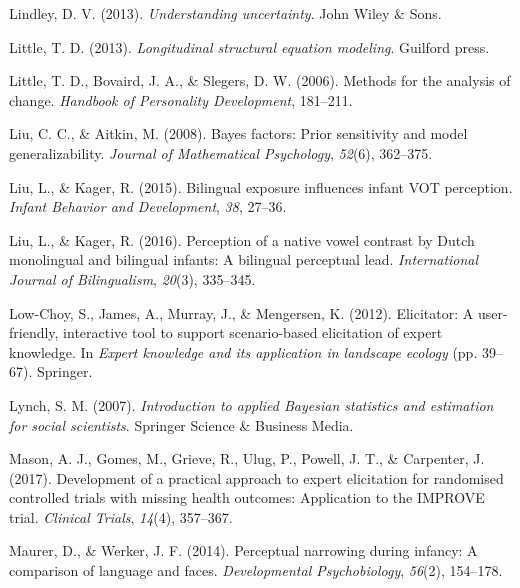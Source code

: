 \documentclass[openright,titlepage,12pt,a4paper]{book}
\begin{document}
\leavevmode\hypertarget{ref-lindley_understanding_2013}{}%
Lindley, D. V. (2013). \emph{Understanding uncertainty}. John Wiley \& Sons.

\leavevmode\hypertarget{ref-little_longitudinal_2013}{}%
Little, T. D. (2013). \emph{Longitudinal structural equation modeling}. Guilford press.

\leavevmode\hypertarget{ref-little_methods_2006}{}%
Little, T. D., Bovaird, J. A., \& Slegers, D. W. (2006). Methods for the analysis of change. \emph{Handbook of Personality Development}, 181--211.

\leavevmode\hypertarget{ref-liu_bayes_2008}{}%
Liu, C. C., \& Aitkin, M. (2008). Bayes factors: Prior sensitivity and model generalizability. \emph{Journal of Mathematical Psychology}, \emph{52}(6), 362--375.

\leavevmode\hypertarget{ref-liu_bilingual_2015}{}%
Liu, L., \& Kager, R. (2015). Bilingual exposure influences infant VOT perception. \emph{Infant Behavior and Development}, \emph{38}, 27--36.

\leavevmode\hypertarget{ref-liu_perception_2016}{}%
Liu, L., \& Kager, R. (2016). Perception of a native vowel contrast by Dutch monolingual and bilingual infants: A bilingual perceptual lead. \emph{International Journal of Bilingualism}, \emph{20}(3), 335--345.

\leavevmode\hypertarget{ref-low-choy_elicitator:_2012}{}%
Low-Choy, S., James, A., Murray, J., \& Mengersen, K. (2012). Elicitator: A user-friendly, interactive tool to support scenario-based elicitation of expert knowledge. In \emph{Expert knowledge and its application in landscape ecology} (pp. 39--67). Springer.

\leavevmode\hypertarget{ref-lynch_introduction_2007}{}%
Lynch, S. M. (2007). \emph{Introduction to applied Bayesian statistics and estimation for social scientists}. Springer Science \& Business Media.

\leavevmode\hypertarget{ref-mason_development_2017}{}%
Mason, A. J., Gomes, M., Grieve, R., Ulug, P., Powell, J. T., \& Carpenter, J. (2017). Development of a practical approach to expert elicitation for randomised controlled trials with missing health outcomes: Application to the IMPROVE trial. \emph{Clinical Trials}, \emph{14}(4), 357--367.

\leavevmode\hypertarget{ref-maurer_perceptual_2014}{}%
Maurer, D., \& Werker, J. F. (2014). Perceptual narrowing during infancy: A comparison of language and faces. \emph{Developmental Psychobiology}, \emph{56}(2), 154--178.
\end{document}
